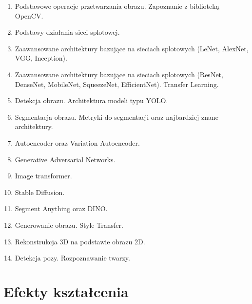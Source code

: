 \documentclass[12pt, a4paper]{article}
\begin{document}
\begin{enumerate}
  \item Podstawowe operacje przetwarzania obrazu. Zapoznanie z biblioteką OpenCV.
  \item Podstawy działania sieci splotowej.
  \item Zaawansowane architektury bazujące na sieciach splotowych (LeNet, AlexNet, VGG, Inception).
  \item Zaawansowane architektury bazujące na sieciach splotowych (ResNet, DenseNet, MobileNet, SqueezeNet, EfficientNet). Transfer Learning.
  \item Detekcja obrazu. Architektura modeli typu YOLO.
  \item Segmentacja obrazu. Metryki do segmentacji oraz najbardziej znane architektury.
  \item Autoencoder oraz Variation Autoencoder.
  \item Generative Adversarial Networks.
  \item Image transformer.
  \item Stable Diffusion.
  \item Segment Anything oraz DINO.
  \item Generowanie obrazu. Style Transfer.
  \item Rekonstrukcja 3D na podstawie obrazu 2D.
  \item Detekcja pozy. Rozpoznawanie twarzy.
\end{enumerate}

\section{Efekty kształcenia}
\end{document}
